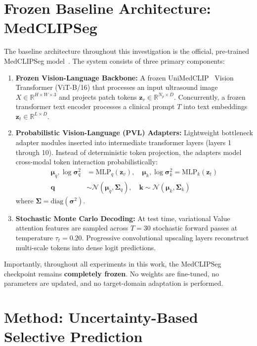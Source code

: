 \documentclass[10pt,journal,compsoc]{IEEEtran}
\begin{document}
\section{Frozen Baseline Architecture: MedCLIPSeg}
The baseline architecture throughout this investigation is the official, pre-trained MedCLIPSeg model~\cite{koleilat2026medclipseg}. The system consists of three primary components:
\begin{enumerate}
    \item \textbf{Frozen Vision-Language Backbone:} A frozen UniMedCLIP~\cite{wang2022medclip} Vision Transformer (ViT-B/16) that processes an input ultrasound image $X \in \mathbb{R}^{H \times W \times 3}$ and projects patch tokens $\mathbf{z}_v \in \mathbb{R}^{N_p \times D}$. Concurrently, a frozen transformer text encoder processes a clinical prompt $T$ into text embeddings $\mathbf{z}_t \in \mathbb{R}^{L \times D}$.
    \item \textbf{Probabilistic Vision-Language (PVL) Adapters:} Lightweight bottleneck adapter modules inserted into intermediate transformer layers (layers 1 through 10). Instead of deterministic token projection, the adapters model cross-modal token interaction probabilistically:
    \begin{align}
        \boldsymbol{\mu}_{q}, \log \boldsymbol{\sigma}^2_{q} &= \mathrm{MLP}_q(\mathbf{z}_v), \quad \boldsymbol{\mu}_{k}, \log \boldsymbol{\sigma}^2_{k} = \mathrm{MLP}_k(\mathbf{z}_t) \\
        \mathbf{q} &\sim \mathcal{N}(\boldsymbol{\mu}_q, \boldsymbol{\Sigma}_q), \quad \mathbf{k} \sim \mathcal{N}(\boldsymbol{\mu}_k, \boldsymbol{\Sigma}_k)
    \end{align}
    where $\boldsymbol{\Sigma} = \mathrm{diag}(\boldsymbol{\sigma}^2)$.
    \item \textbf{Stochastic Monte Carlo Decoding:} At test time, variational Value attention features are sampled across $T=30$ stochastic forward passes at temperature $\tau_t = 0.20$. Progressive convolutional upscaling layers reconstruct multi-scale tokens into dense logit predictions.
\end{enumerate}

Importantly, throughout all experiments in this work, the MedCLIPSeg checkpoint remains \textbf{completely frozen}. No weights are fine-tuned, no parameters are updated, and no target-domain adaptation is performed.

\section{Method: Uncertainty-Based Selective Prediction}
\end{document}
